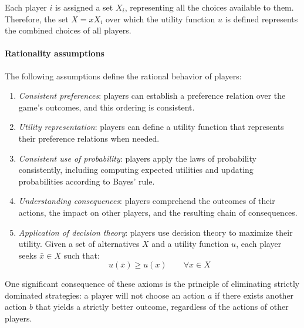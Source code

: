 Each player $i$ is assigned a set $X_i$, representing all the choices available to them.
Therefore, the set $X=xX_i$ over which the utility function $u$ is defined represents the combined choices of all players.

\paragraph*{Rationality assumptions}
The following assumptions define the rational behavior of players:
\begin{enumerate}
    \item \textit{Consistent preferences}: players can establish a preference relation over the game's outcomes, and this ordering is consistent.
    \item \textit{Utility representation}: players can define a utility function that represents their preference relations when needed.
    \item \textit{Consistent use of probability}: players apply the laws of probability consistently, including computing expected utilities and updating probabilities according to Bayes' rule.
    \item \textit{Understanding consequences}: players comprehend the outcomes of their actions, the impact on other players, and the resulting chain of consequences.
    \item \textit{Application of decision theory}: players use decision theory to maximize their utility.
        Given a set of alternatives $X$ and a utility function $u$, each player seeks $\bar{x}\in X$ such that: 
        \[u(\bar{x}) \geq u(x)\qquad\forall x \in X\]
\end{enumerate}
One significant consequence of these axioms is the principle of eliminating strictly dominated strategies: a player will not choose an action $a$ if there exists another action $b$ that yields a strictly better outcome, regardless of the actions of other players.
